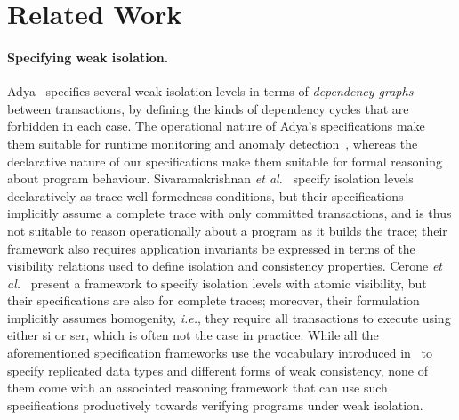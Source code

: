 \section{Related Work}
\label{sec:relatedwork}

\paragraph{Specifying weak isolation.}
Adya~\cite{adyaphd} specifies several weak isolation levels in terms
of \emph{dependency graphs} between transactions, by defining the
kinds of dependency cycles that are forbidden in each case. The
operational nature of Adya's specifications make them suitable for
runtime monitoring and anomaly
detection~\cite{kemmevldb,feketesigmod08,pssi2011}, whereas the
declarative nature of our specifications make them suitable for formal
reasoning about program behaviour. Sivaramakrishnan \emph{et
  al.}~\cite{pldi15} specify isolation levels declaratively as trace
well-formedness conditions, but their specifications implicitly assume
a complete trace with only committed transactions, and is thus not
suitable to reason operationally about a program as it builds the
trace; their framework also requires application invariants be
expressed in terms of the visibility relations used to define
isolation and consistency properties.  Cerone \emph{et
  al.}~\cite{gotsmanconcur15} present a framework to specify isolation
levels with atomic visibility, but their specifications are also for
complete traces; moreover, their formulation implicitly assumes
homogenity, \emph{i.e.}, they require all transactions to execute
using either {\sc si} or {\sc ser}, which is often not the case in
practice. While all the aforementioned specification frameworks use
the vocabulary introduced in~\cite{burckhardt14} to specify replicated
data types and different forms of weak consistency, none of them come
with an associated reasoning framework that can use such
specifications productively towards verifying programs under weak
isolation.

